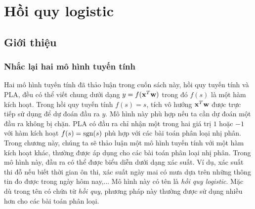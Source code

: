 \chapter{Hồi quy logistic}
\label{cha:logisticregression}
\section{Giới thiệu}

\subsection{Nhắc lại hai mô hình tuyến tính}
Hai mô hình tuyến tính đã thảo luận trong cuốn sách này, hồi quy tuyến tính và
PLA, đều có thể viết chung dưới dạng $y = f(\mathbf{x}^T\mathbf{w})$ trong đó $f(s)$ là một
hàm kích hoạt. Trong hồi quy tuyến tính $f(s) = s$, tích vô hướng $\mathbf{x}^T\mathbf{w}$
được trực tiếp sử dụng để dự đoán đầu ra $y$. Mô hình này phù hợp nếu ta cần dự
đoán một đầu ra không bị chặn. PLA có đầu ra chỉ nhận một trong hai giá trị $1$
hoặc $-1$ với hàm kích hoạt $f(s) = \text{sgn}(s)$ phù hợp với các bài toán phân loại
nhị phân. Trong chương này, chúng ta sẽ thảo luận một mô hình tuyến tính với một
hàm kích hoạt khác, thường được áp dụng cho các bài toán phân loại nhị phân.
Trong mô hình này, đầu ra có thể được biểu diễn dưới dạng xác suất. Ví dụ, xác
suất thi đỗ nếu biết thời gian ôn thi, xác suất ngày mai có mưa dựa trên những
thông tin đo được trong ngày hôm nay,... Mô hình này có tên là \textit{hồi quy
logistic}. Mặc dù trong tên có chứa từ \textit{hồi quy}, phương pháp này thường
được sử dụng nhiều hơn cho các bài toán phân loại.


